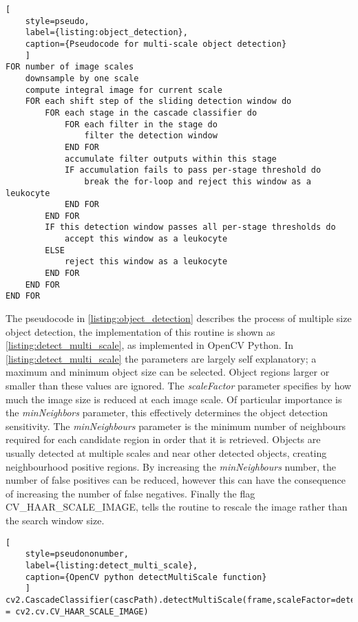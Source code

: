 \begin{lstlisting}[
	style=pseudo,
	label={listing:object_detection},
	caption={Pseudocode for multi-scale object detection}
	]
FOR number of image scales
	downsample by one scale
	compute integral image for current scale
	FOR each shift step of the sliding detection window do
		FOR each stage in the cascade classifier do
			FOR each filter in the stage do
				filter the detection window
			END FOR
			accumulate filter outputs within this stage
			IF accumulation fails to pass per-stage threshold do
				break the for-loop and reject this window as a leukocyte
			END FOR
		END FOR
		IF this detection window passes all per-stage thresholds do
			accept this window as a leukocyte
		ELSE
			reject this window as a leukocyte
		END FOR
	END FOR
END FOR
\end{lstlisting}
The pseudocode in \autoref{listing:object_detection} describes the process of multiple size object detection, the implementation of this routine is shown as \autoref{listing:detect_multi_scale}, as implemented in OpenCV Python. In \autoref{listing:detect_multi_scale} the parameters are largely self explanatory; a maximum and minimum object size can be selected. Object regions larger or smaller than these values are ignored. The \emph{scaleFactor} parameter specifies by how much the image size is reduced at each image scale. Of particular importance is the \emph{minNeighbors} parameter, this effectively determines the object detection sensitivity. The \emph{minNeighbours} parameter is the minimum number of neighbours required for each candidate region in order that it is retrieved. Objects are usually detected at multiple scales and near other detected objects, creating neighbourhood positive regions. By increasing the \emph{minNeighbours} number, the number of false positives can be reduced, however this can have the consequence of increasing the number of false negatives. Finally the flag CV\_HAAR\_SCALE\_IMAGE, tells the routine to rescale the image rather than the search window size.

\begin{lstlisting}[
	style=pseudononumber,
	label={listing:detect_multi_scale},
	caption={OpenCV python detectMultiScale function}
	]
cv2.CascadeClassifier(cascPath).detectMultiScale(frame,scaleFactor=detectParticlesScaleFactor,minNeighbors=detectParticlesMinNeighbors,minSize=detectParticlesMinSize,maxSize=detectParticlesMaxSize,flags = cv2.cv.CV_HAAR_SCALE_IMAGE)
\end{lstlisting}

